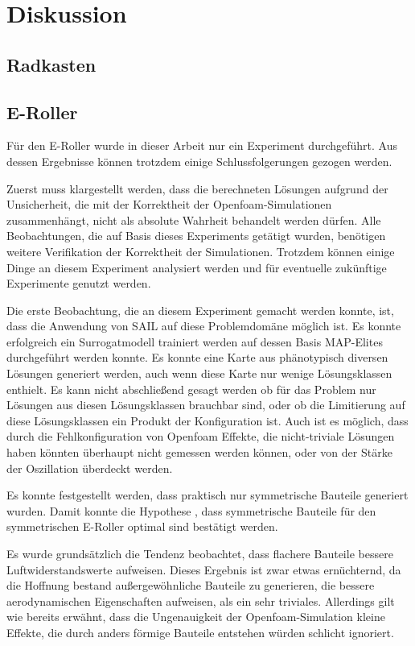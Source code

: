 \section{Diskussion}

\subsection{Radkasten}

\subsection{E-Roller}

Für den E-Roller wurde in dieser Arbeit nur ein Experiment durchgeführt.
Aus dessen Ergebnisse können trotzdem einige Schlussfolgerungen gezogen werden.

Zuerst muss klargestellt werden, dass  die berechneten Lösungen aufgrund der Unsicherheit, die mit der Korrektheit der Openfoam-Simulationen zusammenhängt, nicht als absolute Wahrheit behandelt werden dürfen.
Alle Beobachtungen, die auf Basis dieses Experiments getätigt wurden, benötigen weitere Verifikation der Korrektheit der Simulationen.
Trotzdem können einige Dinge an diesem Experiment analysiert werden und für eventuelle zukünftige Experimente genutzt werden.

Die erste Beobachtung, die an diesem Experiment gemacht werden konnte, ist, dass die Anwendung von SAIL auf diese Problemdomäne möglich ist.
Es konnte erfolgreich ein Surrogatmodell trainiert werden auf dessen Basis MAP-Elites durchgeführt werden konnte.
Es konnte eine Karte aus phänotypisch diversen Lösungen generiert werden, auch wenn diese Karte nur wenige Lösungsklassen enthielt.
Es kann nicht abschließend gesagt werden ob für das Problem nur Lösungen aus diesen Lösungsklassen brauchbar sind, oder ob die Limitierung auf diese Lösungsklassen ein Produkt der Konfiguration ist.
Auch ist es möglich, dass durch die Fehlkonfiguration von Openfoam Effekte, die nicht-triviale Lösungen haben könnten überhaupt nicht gemessen werden können, oder von der Stärke der Oszillation überdeckt werden.

Es konnte festgestellt werden, dass praktisch nur symmetrische Bauteile generiert wurden.
Damit konnte die Hypothese , dass symmetrische Bauteile für den symmetrischen E-Roller optimal sind bestätigt werden.

Es wurde grundsätzlich die Tendenz beobachtet, dass flachere Bauteile bessere Luftwiderstandswerte aufweisen.
Dieses Ergebnis ist zwar etwas ernüchternd, da die Hoffnung bestand außergewöhnliche Bauteile zu generieren, die bessere aerodynamischen Eigenschaften aufweisen, als ein sehr triviales.
Allerdings gilt wie bereits erwähnt, dass die Ungenauigkeit der Openfoam-Simulation kleine Effekte, die durch anders förmige Bauteile entstehen würden schlicht ignoriert.


